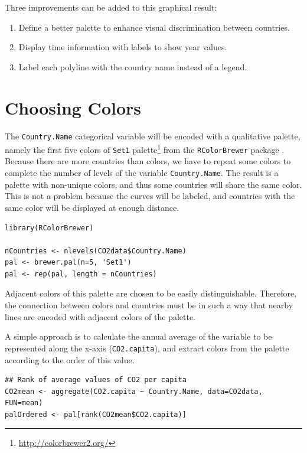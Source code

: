 \documentclass[smallroyalvopaper]{memoir}
\begin{document}
Three improvements can be added to this graphical result: 
\begin{enumerate}
\item Define a better palette to enhance visual discrimination between
countries.
\item Display time information with labels to show year values.
\item Label each polyline with the country name instead of a legend.
\end{enumerate}

\section{Choosing Colors}
\label{sec:org89622e3}
The \texttt{Country.Name} categorical variable will be encoded with a
qualitative palette, namely the first five colors of \texttt{Set1}
palette\footnote{\url{http://colorbrewer2.org/}} from the \texttt{RColorBrewer} package
\cite{Neuwirth2011}. Because there are more countries than colors, we
have to repeat some colors to complete the number of levels of the
variable \texttt{Country.Name}. The result is a palette with non-unique
colors, and thus some countries will share the same color. This is not
a problem because the curves will be labeled, and countries with the
same color will be displayed at enough distance.


\lstset{language=r,label= ,caption= ,captionpos=b,numbers=none}
\begin{lstlisting}
library(RColorBrewer)

nCountries <- nlevels(CO2data$Country.Name)
pal <- brewer.pal(n=5, 'Set1')
pal <- rep(pal, length = nCountries)
\end{lstlisting}

Adjacent colors of this palette are chosen to be easily
distinguishable. Therefore, the connection between colors and
countries must be in such a way that nearby lines are encoded
with adjacent colors of the palette.

A simple approach is to calculate the annual average of the
variable to be represented along the x-axis (\texttt{CO2.capita}), and
extract colors from the palette according to the order of this
value.  


\lstset{language=r,label= ,caption= ,captionpos=b,numbers=none}
\begin{lstlisting}
## Rank of average values of CO2 per capita
CO2mean <- aggregate(CO2.capita ~ Country.Name, data=CO2data, FUN=mean)
palOrdered <- pal[rank(CO2mean$CO2.capita)]  
\end{lstlisting}
\end{document}
